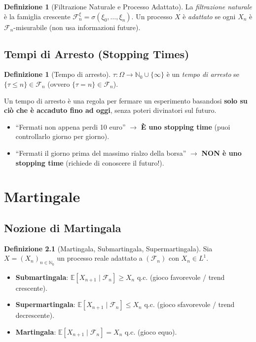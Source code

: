 \documentclass[11pt, a4paper]{report}
\theoremstyle{plain}
\theoremstyle{definition}
\newtheorem{definition}[theorem]{Definizione}
\theoremstyle{remark}
\newcommand{\E}{\mathbb{E}}
\newcommand{\F}{\mathcal{F}}
\newcommand{\N}{\mathbb{N}}
\newcommand{\1}{\mathbf{1}}
\begin{document}
\begin{definition}[Filtrazione Naturale e Processo Adattato]
La \emph{filtrazione naturale} è la famiglia crescente $\F_n^\xi = \sigma(\xi_0, \dots, \xi_n)$. Un processo $X$ è \emph{adattato} se ogni $X_n$ è $\F_n$-misurabile (non usa informazioni future).
\end{definition}

\section{Tempi di Arresto (Stopping Times)}

\begin{definition}[Tempo di arresto]
$\tau : \Omega \to \N_0 \cup \{\infty\}$ è un \emph{tempo di arresto} se $\{\tau \le n\} \in \F_n$ (ovvero $\{\tau = n\} \in \F_n$).
\end{definition}

\begin{spiegazione}
    Un tempo di arresto è una regola per fermare un esperimento basandosi \textbf{solo su ciò che è accaduto fino ad oggi}, senza poteri divinatori sul futuro.
    \begin{itemize}
        \item ``Fermati non appena perdi 10 euro'' $\to$ \textbf{È uno stopping time} (puoi controllarlo giorno per giorno).
        \item ``Fermati il giorno prima del massimo rialzo della borsa'' $\to$ \textbf{NON è uno stopping time} (richiede di conoscere il futuro!).
    \end{itemize}
\end{spiegazione}

\newpage

\chapter{Martingale}

\section{Nozione di Martingala}

\begin{definition}[Martingala, Submartingala, Supermartingala]
Sia $X = (X_n)_{n \in \N_0}$ un processo reale adattato a $(\F_n)$ con $X_n \in L^1$.
\begin{itemize}
    \item \textbf{Submartingala}: $\E[X_{n+1} \mid \F_n] \ge X_n$ q.c. (gioco favorevole / trend crescente).
    \item \textbf{Supermartingala}: $\E[X_{n+1} \mid \F_n] \le X_n$ q.c. (gioco sfavorevole / trend decrescente).
    \item \textbf{Martingala}: $\E[X_{n+1} \mid \F_n] = X_n$ q.c. (gioco equo).
\end{itemize}
\end{definition}
\end{document}
